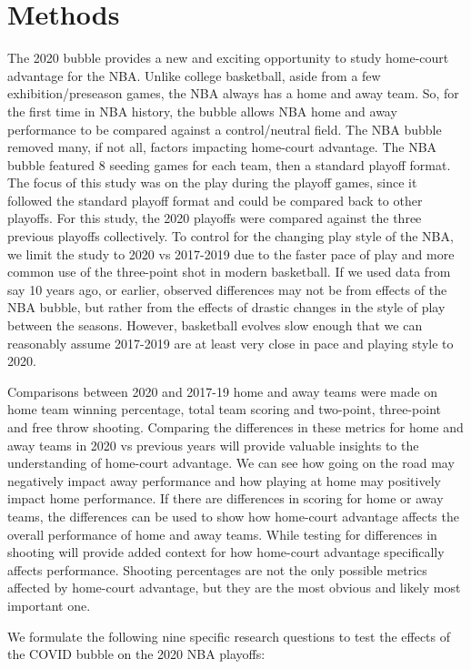\documentclass[10pt]{article}
\begin{document}
\section{Methods}

The 2020 bubble provides a new and exciting opportunity to study home-court
advantage for the NBA. Unlike college basketball, aside from a few
exhibition/preseason games, the NBA always has a home and away team. So, for
the first time in NBA history, the bubble allows NBA home and away performance
to be compared against a control/neutral field. The NBA bubble
removed many, if not all, factors impacting home-court advantage. The NBA 
bubble featured 8 seeding games for each team, then a
standard playoff format. The focus of this study was on the play during the playoff
games, since it followed the standard playoff format and could be compared
back to other playoffs. For this study, the 2020 playoffs were compared against
the three previous playoffs collectively. To control
for the changing play style of the NBA, we limit the study to 2020 vs 2017-2019
due to the faster pace of play and more common use of the three-point shot
in modern basketball. If we used data from say 10 years ago, or earlier, observed
differences may not be from effects of the NBA bubble, but rather from the effects
of drastic changes in the style of play between the seasons. However, basketball
evolves slow enough that we can reasonably assume 2017-2019 are at least very
close in pace and playing style to 2020.

Comparisons between 2020 and 2017-19 home and away teams were made on home team
winning percentage, total team scoring and two-point, three-point and free throw
shooting. Comparing the differences in these metrics for home and away teams in
2020 vs previous years will provide valuable insights to the understanding of
home-court advantage. We can see how going on the road may negatively impact
away performance and how playing at home may positively impact home performance.
If there are differences in scoring for home or away teams, the differences can
be used to show how home-court advantage affects the overall performance of home
and away teams. While testing for differences in shooting will provide added
context for how home-court advantage specifically affects performance.
Shooting percentages are not the only possible metrics affected by home-court
advantage, but they are the most obvious and likely most important one.

We formulate the following nine specific research questions to test
the effects of the COVID bubble on the 2020 NBA playoffs:
\end{document}
